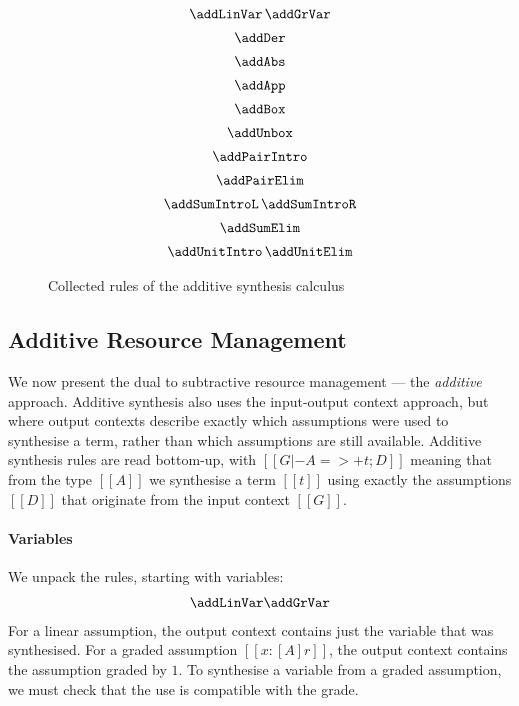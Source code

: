 \begin{figure}[H]
\begin{align*}
\begin{array}{c}
  \addLinVar
  \,
  \addGrVar
\\[0.5em]
  \addDer
\\[0.5em]
  \addAbs
\\[0.5em]
  \addApp
\\[0.5em]
  \addBox
  \\[0.5em]
  \addUnbox
\\[0.5em]
  \addPairIntro
\\[0.5em]
  \addPairElim
\\[0.5em]
  \addSumIntroL
  \,
  \addSumIntroR
\\[0.5em]
  \addSumElim
\\[0.5em]
  \addUnitIntro
  \,
  \addUnitElim
      \end{array}
  \end{align*}
\caption{Collected rules of the additive synthesis calculus}
\label{fig:add-rules}
  \end{figure}

\subsection{Additive Resource Management}
We now present the dual to subtractive resource management --- the
\emph{additive} approach.
Additive synthesis also uses the input-output context approach, but where
output contexts describe exactly which assumptions were used to synthesise
a term, rather than which assumptions are still available. Additive
   synthesis rules are read bottom-up, with $[[G |- A =>+ t; D]]$
  meaning that from the type $[[A]]$ we synthesise a term $[[t]]$ using
  exactly the assumptions $[[D]]$ that originate from the input
  context $[[G]]$.

  \paragraph{Variables}
  We unpack the rules, starting with variables:
%
\begin{align*}
  \addLinVar
  \addGrVar
  \end{align*}
%
For a linear assumption, the output context contains
just the variable that was synthesised. For a graded assumption $[[x : [A] r]]$, the output
context contains the assumption graded by $1$. To synthesise a
variable from a graded assumption, we must check that the use is
compatible with the grade.

